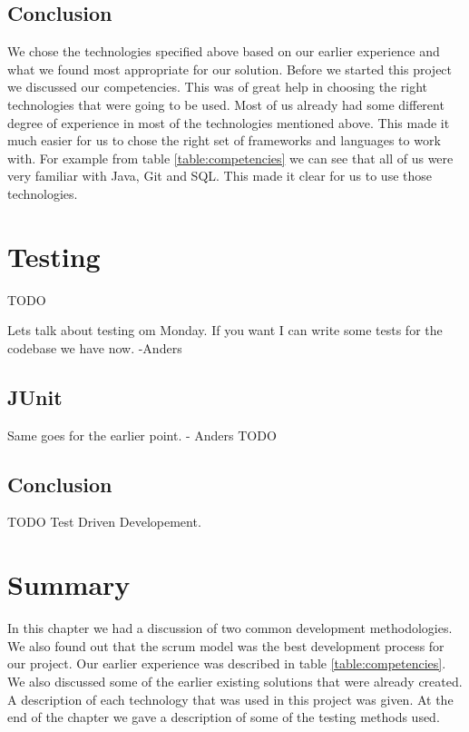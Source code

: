 \subsection{Conclusion}

We chose the technologies specified above based on our earlier experience and what we found most appropriate for our solution.
Before we started this project we discussed our competencies.
This was of great help in choosing the right technologies that were going to be used.
Most of us already had some different degree of experience in most of the technologies mentioned above.
This made it much easier for us to chose the right set of frameworks and languages to work with.
For example from table \ref{table:competencies} we can see that all of us were very familiar with Java, Git and SQL.
This made it clear for us to use those technologies.

\section{Testing}

TODO

Lets talk about testing om Monday. If you want I can write some tests for the codebase we have now. -Anders

\subsection{JUnit}

Same goes for the earlier point. - Anders
TODO

\subsection{Conclusion}

TODO
Test Driven Developement.


\section{Summary}

In this chapter we had a discussion of two common development methodologies.
We also found out that the scrum model was the best development process for our project.
Our earlier experience was described in table \ref{table:competencies}.
We also discussed some of the earlier existing solutions that were already created.
A description of each technology that was used in this project was given. 
At the end of the chapter we gave a description of some of the testing methods used.
